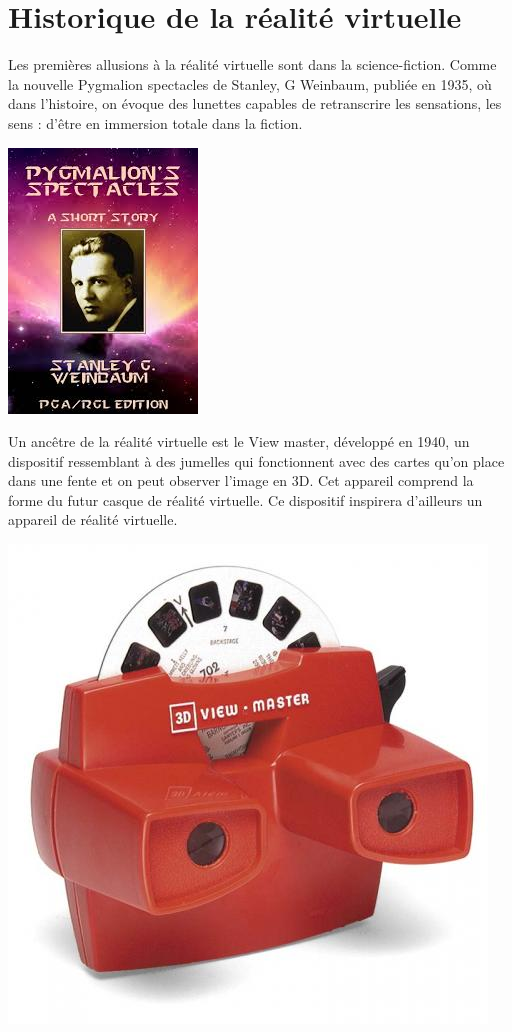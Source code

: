 \documentclass[12pt, a4paper]{report}
\begin{document}
\section[Historique]{Historique de la réalité virtuelle}

Les premières allusions à la réalité virtuelle sont dans la science-fiction. Comme la nouvelle  Pygmalion spectacles  de Stanley, G Weinbaum, publiée en 1935, où dans l'histoire, on évoque des lunettes capables de retranscrire les sensations, les sens : d'être en immersion totale dans la fiction.
\begin{center}
\includegraphics[scale=0.3]{pygmalion.jpeg}
\end{center}



Un ancêtre de la réalité virtuelle est le View master, développé en 1940, un dispositif ressemblant à des jumelles qui fonctionnent avec des cartes qu'on place dans une fente et on peut observer l'image en 3D. Cet appareil comprend la forme du futur casque de réalité virtuelle. Ce dispositif inspirera d'ailleurs un appareil de réalité virtuelle.

\begin{center}
\includegraphics[scale=0.18]{viewmaster.jpg}
\end{center}
\end{document}
